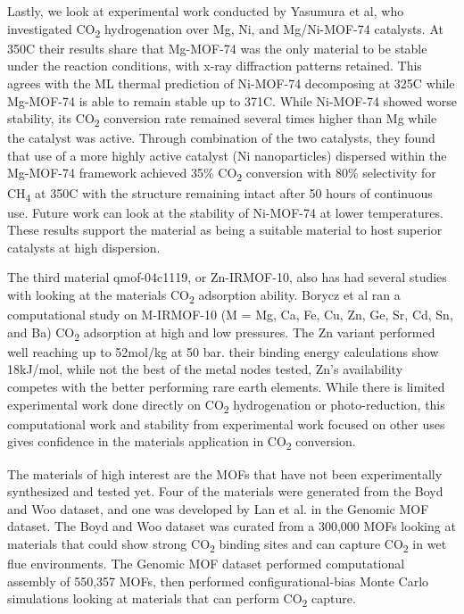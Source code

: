 \documentclass[twoside,twocolumn,9pt]{article}
\begin{document}
Lastly, we look at experimental work conducted by Yasumura et al\cite{yasumura_co2_2025}, who investigated CO\textsubscript{2} hydrogenation over Mg, Ni, and Mg/Ni-MOF-74 catalysts. At 350\textdegree C their results share that Mg-MOF-74 was the only material to be stable under the reaction conditions, with x-ray diffraction patterns retained. This agrees with the ML thermal prediction of Ni-MOF-74 decomposing at 325\textdegree C while Mg-MOF-74 is able to remain stable up to 371\textdegree C. While Ni-MOF-74 showed worse stability, its CO\textsubscript{2} conversion rate remained several times higher than Mg while the catalyst was active. Through combination of the two catalysts, they found that use of a more highly active catalyst (Ni nanoparticles) dispersed within the Mg-MOF-74 framework achieved 35\% CO\textsubscript{2} conversion with 80\% selectivity for CH\textsubscript{4} at 350\textdegree C with the structure remaining intact after 50 hours of continuous use. Future work can look at the stability of Ni-MOF-74 at lower temperatures. These results support the material as being a suitable material to host superior catalysts at high dispersion. 

\par

The third material qmof-04c1119, or Zn-IRMOF-10, also has had several studies with looking at the materials CO\textsubscript{2} adsorption ability\cite{yang_ab_2012, yang_porous_2020}. Borycz et al\cite{borycz_co2_2016} ran a computational study on M-IRMOF-10 (M = Mg, Ca, Fe, Cu, Zn, Ge, Sr, Cd, Sn, and Ba) CO\textsubscript{2} adsorption at high and low pressures. The Zn variant performed well reaching up to 52mol/kg at 50 bar. their binding energy calculations show 18kJ/mol, while not the best of the metal nodes tested, Zn's availability competes with the better performing rare earth elements. While there is limited experimental work done directly on CO\textsubscript{2} hydrogenation or photo-reduction, this computational work and stability from experimental work focused on other uses gives confidence in the materials application in CO\textsubscript{2} conversion. 

The materials of high interest are the MOFs that have not been experimentally synthesized and tested yet. Four of the materials were generated from the Boyd and Woo dataset\cite{burner_arcmof_2023}, and one was developed by Lan et al.\cite{lan_large-scale_2019} in the Genomic MOF dataset. The Boyd and Woo dataset was curated from a 300,000 MOFs looking at materials that could show strong CO\textsubscript{2} binding sites and can capture CO\textsubscript{2} in wet flue environments. The Genomic MOF dataset performed computational assembly of 550,357 MOFs, then performed configurational-bias Monte Carlo simulations looking at materials that can perform CO\textsubscript{2} capture. 
\end{document}
